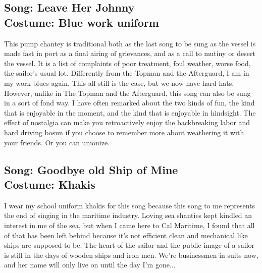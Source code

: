 \documentclass{article}[12pt,letterpaper]
\begin{document}
\subsection{Song: Leave Her Johnny\\
Costume: Blue work uniform}
This pump chantey is traditional both as the last song to be sung as the vessel is made fast in port as a final airing of grievances, and as a call to mutiny or desert the vessel. It is a list of complaints of poor treatment, foul weather, worse food, the sailor’s usual lot. Differently from the Topman and the Afterguard, I am in my work blues again. This all still is the case, but we now have hard hats. However, unlike in The Topman and the Afterguard, this song can also be sung in a sort of fond way. I have often remarked about the two kinds of fun, the kind that is enjoyable in the moment, and the kind that is enjoyable in hindsight. The effect of nostalgia can make you retroactively enjoy the backbreaking labor and hard driving bosun if you choose to remember more about weathering it with your friends. Or you can unionize.
\subsection{Song: Goodbye old Ship of Mine\\
Costume: Khakis}
I wear my school uniform khakis for this song because this song to me represents the end of singing in the maritime industry. Loving sea shanties kept kindled an interest in me of the sea, but when I came here to Cal Maritime, I found that all of that has been left behind because it’s not efficient clean and mechanical like ships are supposed to be. The heart of the sailor and the public image of a sailor is still in the days of wooden ships and iron men. We’re businessmen in suits now, and her name will only live on until the day I’m gone...
\end{document}
